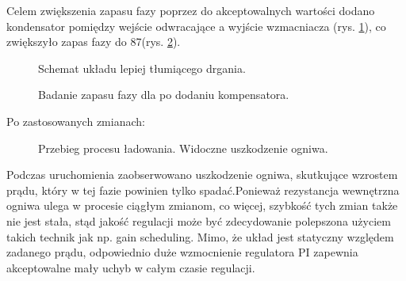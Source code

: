 \documentclass[polish,engineer]{polsl-msth}
\begin{document}
Celem zwiększenia zapasu fazy poprzez do akceptowalnych wartości dodano kondensator pomiędzy wejście odwracające a wyjście wzmacniacza (rys. \ref{img:HereYouAreMrCap}), co zwiększyło zapas fazy do 87\degree (rys. \ref{img:MrBodeWithCap}).
\begin{figure}[hbtp]
    \centering
     \caption{Schemat układu lepiej tłumiącego drgania. \label{img:HereYouAreMrCap}}
\end{figure}
\begin{figure}[hbtp]
     \caption{Badanie zapasu fazy dla po dodaniu kompensatora. \label{img:MrBodeWithCap}}
\end{figure}

Po zastosowanych zmianach:
\begin{figure}[hbtp]
    
     \caption{Przebieg procesu ładowania. Widoczne uszkodzenie ogniwa. \label{img:PrettyChargeWithCellFailure}}
\end{figure}
Podczas uruchomienia zaobserwowano uszkodzenie ogniwa, skutkujące wzrostem prądu, który w tej fazie powinien tylko spadać.Ponieważ rezystancja wewnętrzna ogniwa ulega w procesie ciągłym zmianom, co więcej, szybkość tych zmian także nie jest stała, stąd jakość regulacji może być zdecydowanie polepszona użyciem takich technik jak np. gain scheduling.
Mimo, że układ jest statyczny względem zadanego prądu, odpowiednio duże wzmocnienie regulatora PI zapewnia akceptowalne mały uchyb w całym czasie regulacji. 
\end{document}
